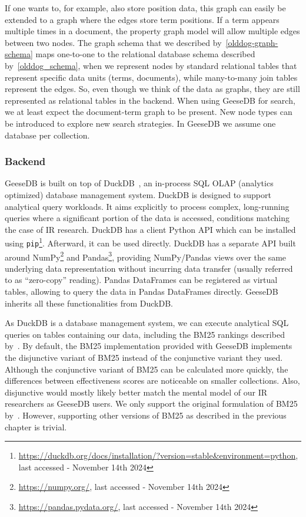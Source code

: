 If one wants to, for example, also store position data, this graph can easily be extended to a graph where the edges store term positions. If a term appears multiple times in a document, the property graph model will allow multiple edges between two nodes. The graph schema that we described by~\cref{olddog-graph-schema} maps one-to-one to the relational database schema described by~\cref{olddog_schema}, when we represent nodes by standard relational tables that represent specific data units (terms, documents), while many-to-many join tables represent the edges. So, even though we think of the data as graphs, they are still represented as relational tables in the backend. When using GeeseDB for search, we at least expect the document-term graph to be present. New node types can be introduced to explore new search strategies. In GeeseDB we assume one database per collection. 

\subsubsection{Backend}
GeeseDB is built on top of DuckDB~\citep{duckdb}, an in-process SQL OLAP (analytics optimized) database management system. DuckDB is designed to support analytical query workloads. It aims explicitly to process complex, long-running queries where a significant portion of the data is accessed, conditions matching the case of IR research. DuckDB has a client Python API which can be installed using \texttt{pip}\footnote{\url{https://duckdb.org/docs/installation/?version=stable&environment=python}, last accessed - November 14th 2024}. Afterward, it can be used directly. DuckDB has a separate API built around NumPy\footnote{\url{https://numpy.org/}, last accessed - November 14th 2024} and Pandas\footnote{\url{https://pandas.pydata.org/}, last accessed - November 14th 2024}, providing NumPy/Pandas views over the same underlying data representation without incurring data transfer (usually referred to as ``zero-copy'' reading). Pandas DataFrames can be registered as virtual tables, allowing to query the data in Pandas DataFrames directly. GeeseDB inherits all these functionalities from DuckDB. 

As DuckDB is a database management system, we can execute analytical SQL queries on tables containing our data, including the BM25 rankings described by~\citet{OldDog}. By default, the BM25 implementation provided with GeeseDB implements the disjunctive variant of BM25 instead of the conjunctive variant they used. Although the conjunctive variant of BM25 can be calculated more quickly, the differences between effectiveness scores are noticeable on smaller collections. Also, disjunctive would mostly likely better match the mental model of our IR researchers as GeeseDB users. We only support the original formulation of BM25 by~\citet{bm25-robertson}. However, supporting other versions of BM25 as described in the previous chapter is trivial.

